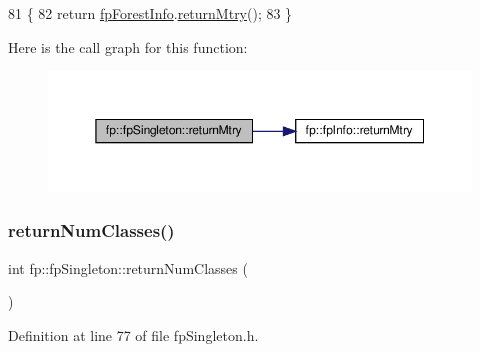 \begin{DoxyCode}
81                                    \{
82                 \textcolor{keywordflow}{return} \hyperlink{classfp_1_1fpSingleton_a85965009befa72a749ae498fa5b6ccfa}{fpForestInfo}.\hyperlink{classfp_1_1fpInfo_a058477c4f05818c220efa469b7b630bb}{returnMtry}();
83             \}
\end{DoxyCode}
Here is the call graph for this function\+:\nopagebreak
\begin{figure}[H]
\begin{center}
\leavevmode
\includegraphics[width=350pt]{classfp_1_1fpSingleton_a45ae68ceb91880ddbc0e049a47c371eb_cgraph}
\end{center}
\end{figure}
\mbox{\label{classfp_1_1fpSingleton_a5602580110329a6b25602b1789e4e2c2}} 
\subsubsection{\texorpdfstring{return\+Num\+Classes()}{returnNumClasses()}}
{\footnotesize\ttfamily int fp\+::fp\+Singleton\+::return\+Num\+Classes (\begin{DoxyParamCaption}{ }\end{DoxyParamCaption})\hspace{0.3cm}{\ttfamily [inline]}}



Definition at line 77 of file fp\+Singleton.\+h.


